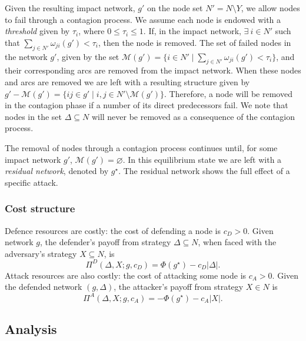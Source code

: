 \documentclass[11pt,fleqn]{article}
\begin{document}

Given the resulting impact network, $g'$ on the node set $N' = N \setminus Y$, we allow nodes to fail through a contagion process. We assume each node is endowed with a \emph{threshold} given by $\tau_{i}$, where $0 \leq \tau_{i} \leq 1$. If, in the impact network, $\exists~i \in N'$ such that $\sum_{j \in N'} \omega_{ji}(g') < \tau_{i}$, then the node is removed. The set of failed nodes in the network $g'$, given by the set $\mathcal{M}(g') = \{ i \in N' \mid \sum_{j \in N'} \omega_{ji}(g') < \tau_{i} \}$, and their corresponding arcs are removed from the impact network. When these nodes and arcs are removed we are left with a resulting structure given by $g' - \mathcal{M}(g') = \{ ij \in g' \mid i,j \in N' \setminus \mathcal{M}(g') \}$. Therefore, a node will be removed in the contagion phase if a number of its direct predecessors fail. We note that nodes in the set $\Delta \subseteq N$ will never be removed as a consequence of the contagion process.


The removal of nodes through a contagion process continues until, for some impact network $g'$, $\mathcal{M}(g') = \varnothing$. In this equilibrium state we are left with a \emph{residual network}, denoted by $g^{\star}$. The residual network shows the full effect of a specific attack.

\subsubsection{Cost structure}

Defence resources are costly: the cost of defending a node is $c_{D} > 0$. Given network $g$, the defender's payoff from strategy $\Delta \subseteq N$, when faced with the adversary's strategy $X \subseteq N$, is
\begin{equation}
  \Pi^{D}(\Delta, X; g, c_{D}) = \Phi(g^{\star}) - c_{D} |\Delta|.
\end{equation}
Attack resources are also costly: the cost of attacking some node is $c_{A} > 0$. Given the defended network $(g, \Delta)$, the attacker's payoff from strategy $X \in N$ is
\begin{equation}
  \Pi^{A}(\Delta, X; g, c_{A}) = - \Phi(g^{\star}) - c_{A} |X|.
\end{equation}

\subsection{Analysis}
\label{subsec:analysis}
\end{document}
